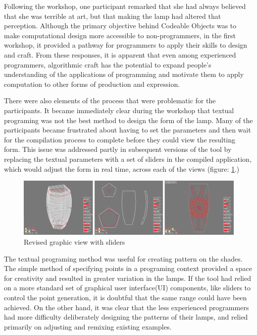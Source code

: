 Following the workshop, one participant remarked that she had always believed that she was terrible at art, but that making the lamp had altered that perception. Although the primary objective behind Codeable Objects was to make computational design more accessible to non-programmers, in the first workshop, it provided a pathway for programmers to apply their skills to design and craft. From these responses, it is apparent that even among experienced programmers, algorithmic craft has the potential to expand people's understanding of the applications of programming and motivate them to apply computation to other forms of production and expression.

There were also elements of the process that were problematic for the participants. It became immediately clear during the workshop that textual programing was not the best method to design the form of the lamp. Many of the participants became frustrated about having to set the parameters and then wait for the compilation process to complete before they could view the resulting form. This issue was addressed partly in subsequent versions of the tool by replacing the textual parameters with a set of sliders in the compiled application, which would adjust the form in real time, across each of the views (figure: \ref{fig:slider_interface}.)
\begin{center}
\begin{figure}[h!]
\includegraphics[width=6.5in]{images/slider_interface.png}
\caption{Revised graphic view with sliders}
\label{fig:slider_interface}
\end{figure}
\end{center}

The textual programing method was useful for creating pattern on the shades. The simple method of specifying points in a programing context provided a space for creativity and resulted in greater variation in the lamps. If the tool had relied on a more standard set of graphical user interface(UI) components, like sliders to control the point generation, it is doubtful that the same range could have been achieved. On the other hand, it was clear that the less experienced programmers had more difficulty deliberately designing the patterns of their lamps, and relied primarily on adjusting and remixing existing examples. 

